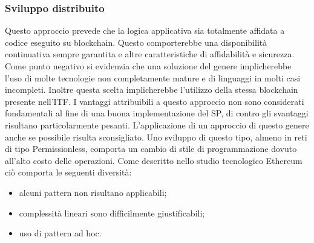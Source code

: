 \subsubsection{Sviluppo distribuito}  
Questo approccio prevede che la logica applicativa sia totalmente affidata a codice eseguito su blockchain. Questo comporterebbe una disponibilità continuativa sempre garantita e altre caratteristiche di affidabilità e sicurezza. Come punto negativo si evidenzia che una soluzione del genere implicherebbe l’uso di molte tecnologie non completamente mature e di linguaggi in molti casi incompleti. Inoltre questa scelta implicherebbe l’utilizzo della stessa blockchain presente nell’ITF. I vantaggi attribuibili a questo approccio non sono considerati fondamentali al fine di una buona implementazione del SP, di contro gli svantaggi risultano particolarmente pesanti. L’applicazione di un approccio di questo genere anche se possibile risulta sconsigliato. Uno sviluppo di questo tipo, almeno in reti di tipo Permissionless, comporta un cambio di stile di programmazione dovuto all’alto costo delle operazioni. Come descritto nello studio tecnologico Ethereum ciò comporta le seguenti diversità:
\begin{itemize}
    \item alcuni pattern non risultano applicabili;
    \item complessità lineari sono difficilmente giustificabili;
    \item uso di pattern ad hoc.
\end{itemize}
